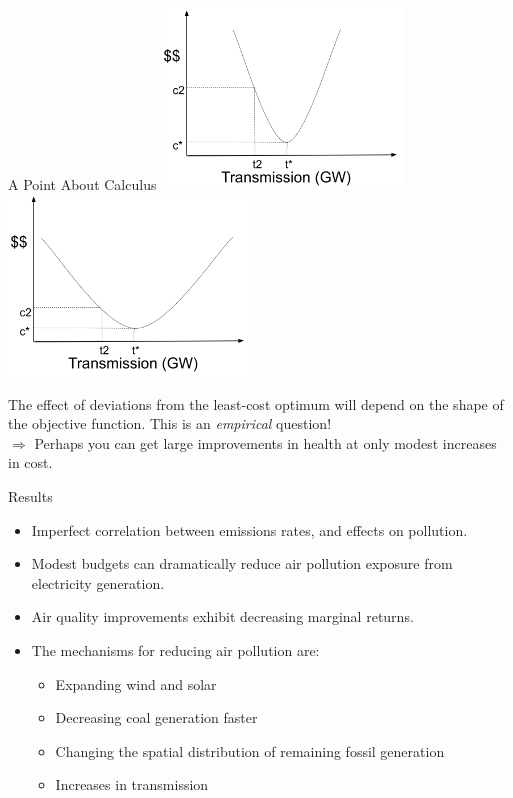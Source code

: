 \documentclass{beamer}
\begin{document}
\begin{frame}{A Point About Calculus}
    \includegraphics[width=0.48\textwidth]{Figures/Slide Pictures/Transmission1.png} \includegraphics[width=0.48\textwidth]{Figures/Slide Pictures/Transmission2.png}

    The effect of deviations from the least-cost optimum will depend on the shape of the objective function.  This is an \textit{empirical} question!\\
    \vspace{.5cm}
    $\Rightarrow$ Perhaps you can get large improvements in health at only modest increases in cost.
\end{frame}


\begin{frame}{Results}
    \begin{itemize}
        \item Imperfect correlation between emissions rates, and effects on pollution.
        \item Modest budgets can dramatically reduce air pollution exposure from electricity generation.
        \item Air quality improvements exhibit decreasing marginal returns.
        \item The mechanisms for reducing air pollution are:
        \begin{itemize}
            \item Expanding wind and solar
            \item Decreasing coal generation faster
            \item Changing the spatial distribution of remaining fossil generation
            \item Increases in transmission
        \end{itemize}
    \end{itemize}
\end{frame}
\end{document}
